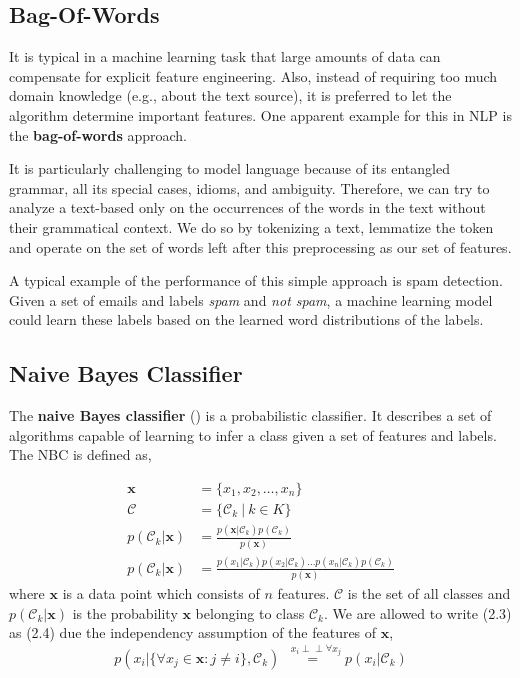 \subsection{Bag-Of-Words}\label{section:bow}
It is typical in a machine learning task that large amounts of data can compensate for explicit feature engineering.
Also, instead of requiring too much domain knowledge (e.g., about the text source), it is preferred to let the algorithm determine important features.
One apparent example for this in NLP is the \textbf{bag-of-words} approach.

It is particularly challenging to model language because of its entangled grammar, all its special cases, idioms, and ambiguity.
Therefore, we can try to analyze a text-based only on the occurrences of the words in the text without their grammatical context. We do so by tokenizing a text, lemmatize the token and operate on the set of words left after this preprocessing as our set of features.

A typical example of the performance of this simple approach is spam detection.
Given a set of emails and labels \emph{spam} and \emph{not spam}, a machine learning model could learn these labels based on the learned word distributions of the labels.

\subsection{Naive Bayes Classifier}\label{section:nbc}
The \textbf{naive Bayes classifier} () is a probabilistic classifier. It describes a set of algorithms capable of learning to infer a class given a set of features and labels. The NBC is defined as,

\begin{align}
  \boldsymbol{x} &= \{x_1, x_2, \dots, x_n\} \\
  \mathcal{C} &= \{\mathcal{C}_k \: | \: k \in K \} \\
  p(\mathcal{C}_k|\boldsymbol{x}) &= \frac{p(\boldsymbol{x} |\mathcal{C}_k) p(\mathcal{C}_k)} {p(\boldsymbol{x})} \\
  p(\mathcal{C}_k|\boldsymbol{x}) &= \frac{p(x_1 |\mathcal{C}_k)
                                       p(x_2 |\mathcal{C}_k) \dots
                                       p(x_n |\mathcal{C}_k)
                                       p(\mathcal{C}_k)}{p(\boldsymbol{x})}
\end{align}
where $\boldsymbol{x}$ is a data point which consists of $n$ features. $\mathcal{C}$ is the set of all classes and $p(\mathcal{C}_k|\boldsymbol{x})$ is the probability $\boldsymbol{x}$ belonging to class $\mathcal{C}_k$. We are allowed to write (2.3) as (2.4) due the independency assumption of the features of $\boldsymbol{x}$,
 \[p(x_i| \{\forall x_j \in \boldsymbol{x} : j \neq i \}, \mathcal{C}_k) \overset{\, \,\,\,x_i\perp\!\!\!\perp \forall x_j}{=} p(x_i|\mathcal{C}_k)\]

